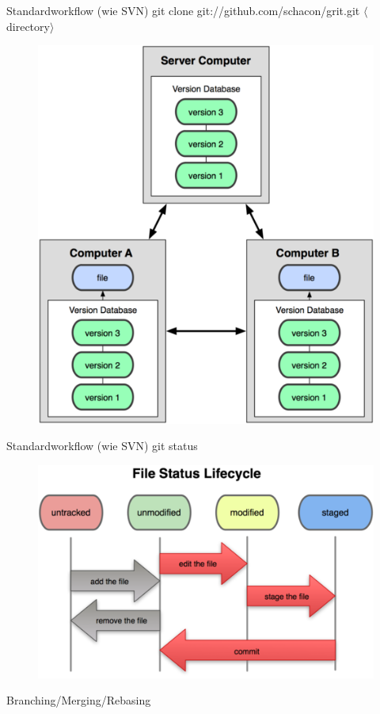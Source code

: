 \documentclass{beamer}
\begin{document}
\begin{frame}{Standardworkflow (wie SVN)}
git clone git://github.com/schacon/grit.git $\langle$directory$\rangle$
\begin{figure} 
\centering
\includegraphics[scale=0.5]{images/18333fig0103-tn.png}
\end{figure}
\end{frame}

\begin{frame}{Standardworkflow (wie SVN)}
git status
\begin{figure} 
\centering
\includegraphics[scale=0.5]{images/18333fig0201-tn.png}
\end{figure}
\end{frame}


\begin{frame}{Branching/Merging/Rebasing}
\end{frame}
\end{document}

